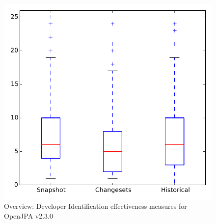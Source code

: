 
\begin{figure}
\centering
\includegraphics[height=0.4\textheight]{figures/dit/all_openjpa}
\caption{Overview: Developer Identification effectiveness measures for OpenJPA v2.3.0}
\label{fig:dit:all:openjpa}
\end{figure}

